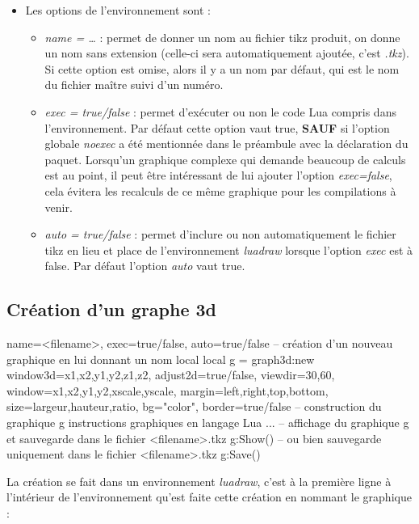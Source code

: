 \begin{itemize}
    \item Les options de l'environnement sont :
    \begin{itemize}
    \item \emph{name = \ldots{}} : permet de donner un nom au fichier tikz produit, on donne un nom sans extension (celle-ci sera automatiquement ajoutée, c'est \emph{.tkz}). Si cette option est omise, alors il y a un nom par défaut, qui est le nom du fichier maître suivi d'un numéro.
    \item \emph{exec = true/false} : permet d'exécuter ou non le code Lua compris dans l'environnement. Par défaut cette option vaut true, \textbf{SAUF} si l'option globale \emph{noexec} a été mentionnée dans le préambule avec la déclaration du paquet. Lorsqu'un graphique complexe qui demande beaucoup de calculs est au point, il peut être intéressant de lui ajouter l'option \emph{exec=false}, cela évitera les recalculs de ce même graphique pour les compilations à venir.
    \item \emph{auto = true/false} : permet d'inclure ou non automatiquement le fichier tikz en lieu et place de l'environnement \emph{luadraw} lorsque l'option \emph{exec} est à false. Par défaut l'option \emph{auto} vaut true.
    \end{itemize}
\end{itemize}


\subsection{Création d'un graphe 3d}

\begin{TeXcode}
\begin{luadraw}{ name=<filename>, exec=true/false, auto=true/false }
-- création d'un nouveau graphique en lui donnant un nom local
local g = graph3d:new{ window3d={x1,x2,y1,y2,z1,z2}, adjust2d=true/false, viewdir={30,60}, window={x1,x2,y1,y2,xscale,yscale}, margin={left,right,top,bottom}, size={largeur,hauteur,ratio}, bg="color", border=true/false }
-- construction du graphique g
    instructions graphiques en langage Lua ...
-- affichage du graphique g et sauvegarde dans le fichier <filename>.tkz
g:Show()
-- ou bien sauvegarde uniquement dans le fichier <filename>.tkz
g:Save()
\end{luadraw}
\end{TeXcode}

La création se fait dans un environnement \emph{luadraw}, c'est à la première ligne à l'intérieur de l'environnement qu'est faite cette création en nommant le graphique :


